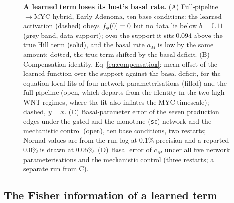\begin{figure}[tbp]
\centering
{}
\caption{\textbf{A learned term loses its host's basal rate.} (A) Full-pipeline
\bcat{}$\to$MYC hybrid, Early Adenoma, ten base conditions: the learned
activation (dashed) obeys $f_{\phi}(0)=0$ but no data lie below $b=0.11$ (grey band,
data support); over the support it sits 0.094 above the true Hill term (solid),
and the basal rate $a_M$ is low by the same amount; dotted, the true term
shifted by the basal deficit. (B) Compensation identity,
Eq~\eqref{eq:compensation}: mean offset of the learned function over the support
against the basal deficit, for the equation-local fits of four network
parameterisations (filled) and the full pipeline (open, which departs from the
identity in the two high-WNT regimes, where the fit also inflates the MYC
timescale); dashed, $y=x$. (C) Basal-parameter error of the seven production
edges under the gated and the monotone (\texttt{sc}) network and the
mechanistic control (open), ten base conditions, two restarts; Normal values
are from the run log at 0.1\% precision and a reported 0.0\% is drawn at
0.05\%. (D) Basal error of $a_M$ under all five network parameterisations and
the mechanistic control (three restarts; a separate run from C).}
\label{fig:learned}
\end{figure}

\subsection{The Fisher information of a learned term}
\label{sec:res-hfim}

